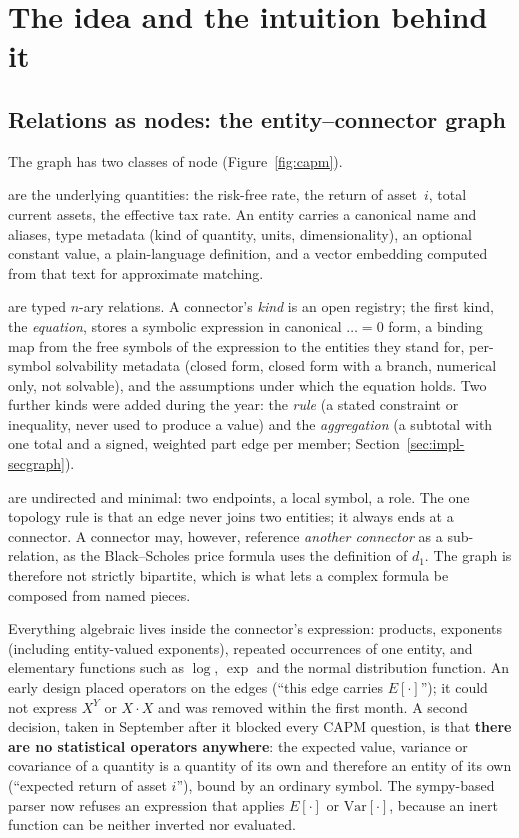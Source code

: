 \section{The idea and the intuition behind it}
\label{sec:idea}

\subsection{Relations as nodes: the entity--connector graph}
\label{sec:idea-graph}

The graph has two classes of node (Figure~\ref{fig:capm}).

 are the underlying quantities: the risk-free rate, the return of asset~\(i\), total current assets, the effective tax rate. An entity carries a canonical name and aliases, type metadata (kind of quantity, units, dimensionality), an optional constant value, a plain-language definition, and a vector embedding computed from that text for approximate matching.

 are typed \(n\)-ary relations. A connector's \emph{kind} is an open registry; the first kind, the \emph{equation}, stores a symbolic expression in canonical \(\ldots = 0\) form, a binding map from the free symbols of the expression to the entities they stand for, per-symbol solvability metadata (closed form, closed form with a branch, numerical only, not solvable), and the assumptions under which the equation holds. Two further kinds were added during the year: the \emph{rule} (a stated constraint or inequality, never used to produce a value) and the \emph{aggregation} (a subtotal with one total and a signed, weighted part edge per member; Section~\ref{sec:impl-secgraph}).

 are undirected and minimal: two endpoints, a local symbol, a role. The one topology rule is that an edge never joins two entities; it always ends at a connector. A connector may, however, reference \emph{another connector} as a sub-relation, as the Black--Scholes price formula uses the definition of \(d_1\). The graph is therefore not strictly bipartite, which is what lets a complex formula be composed from named pieces.

Everything algebraic lives inside the connector's expression: products, exponents (including entity-valued exponents), repeated occurrences of one entity, and elementary functions such as \(\log\), \(\exp\) and the normal distribution function. An early design placed operators on the edges (``this edge carries \(E[\cdot]\)''); it could not express \(X^{Y}\) or \(X\cdot X\) and was removed within the first month. A second decision, taken in September after it blocked every CAPM question, is that \textbf{there are no statistical operators anywhere}: the expected value, variance or covariance of a quantity is a quantity of its own and therefore an entity of its own (``expected return of asset \(i\)''), bound by an ordinary symbol. The sympy-based parser now refuses an expression that applies \(E[\cdot]\) or \(\mathrm{Var}[\cdot]\), because an inert function can be neither inverted nor evaluated.

